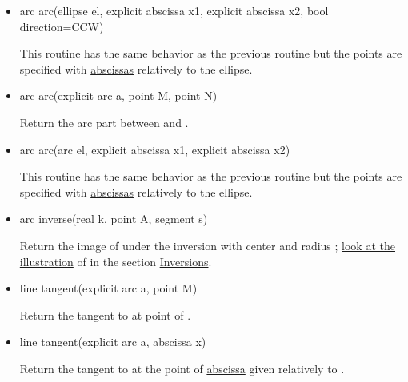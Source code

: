 \documentclass[pdftex]{article}
\begin{document}
\begin{itemize}
\item {}
  \begin{Vcolor}
    arc arc(ellipse el, explicit abscissa x1, explicit abscissa x2, bool direction=CCW)
  \end{Vcolor}
  This routine has the same behavior as the previous routine but the
  points are specified with \href{#section.abscissa}{abscissas}
  relatively to the ellipse.
\item {}
  \begin{Vcolor}
    arc arc(explicit arc a, point M, point N)
  \end{Vcolor}
  Return the arc part  between  and .
\item {}
  \begin{Vcolor}
    arc arc(arc el, explicit abscissa x1, explicit abscissa x2)
  \end{Vcolor}
  This routine has the same behavior as the previous routine but the
  points are specified with \href{#section.abscissa}{abscissas}
  relatively to the ellipse.
\item {}
  \begin{Vcolor}
    arc inverse(real k, point A, segment s)
  \end{Vcolor}
  Return the image of  under the inversion with
  center  and radius ; \href{#inversion_damier}{look
    at the illustration} of \linebreak {} in the
  section \href{#section.inversion}{Inversions}.
\item {}
  \begin{Vcolor}
    line tangent(explicit arc a, point M)
  \end{Vcolor}
  Return the tangent to  at point  of .
\item {}
  \begin{Vcolor}
    line tangent(explicit arc a, abscissa x)
  \end{Vcolor}
  Return the tangent to  at the point of
  \href{#section.abscissa}{abscissa}  given relatively to .
\end{itemize}
\end{document}
